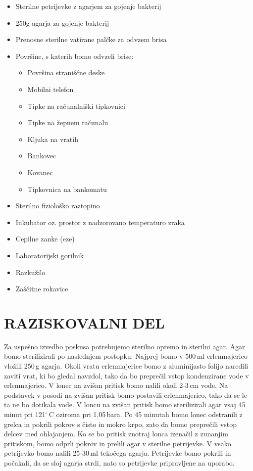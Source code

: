 \documentclass[12pt, a4paper]{report}
\begin{document}
\begin{itemize}
  \item Sterilne petrijevke z agarjem za gojenje bakterij
  \item 250g agarja za gojenje bakterij
  \item Prenosne sterilne vatirane palčke za odvzem brisa
  \item Površine, s katerih bomo odvzeli brise:
  \begin{itemize}
    \item Površina straniščne deske
    \item Mobilni telefon
    \item Tipke na računalniški tipkovnici
    \item Tipke na žepnem računalu
    \item Kljuka na vratih
    \item Bankovec
    \item Kovanec
    \item Tipkovnica na bankomatu
  \end{itemize}
  \item Sterilno fiziološko raztopino
  \item Inkubator oz. prostor z nadzorovano temperaturo zraka
  \item Cepilne zanke (eze)
  \item Laboratorijski gorilnik
  \item Razkužilo
  \item Zaščitne rokavice

\end{itemize}

\chapter{RAZISKOVALNI DEL}

Za uspešno izvedbo poskusa potrebujemo sterilno opremo in sterilni agar. Agar bomo sterilizirali po naslednjem postopku: Najprej bomo v 500\,ml erlenmajerico vložili 250\,g agarja. Okoli vratu erlenmajerice bomo z aluminijasto folijo naredili zaviti vrat, ki bo gledal navzdol, tako da bo preprečil vstop kondenzirane vode v erlenmajerico. V lonec na zvišan pritisk bomo nalili okoli 2-3\,cm vode. Na podstavek v posodi na zvišan pritisk bomo postavili erlenmajerico, tako da se le-ta ne bo dotikala vode. V loncu na zvišan pritisk bomo sterilizirali agar vsaj 45 minut pri 121$^\circ$\,C oziroma pri 1,05\,bara. Po 45 minutah bomo lonec odstranili z grelca in pokrili pokrov s čisto in mokro krpo, zato da bomo preprečili vstop delcev med ohlajanjem. Ko se bo pritisk znotraj lonca izenačil z zunanjim pritiskom, bomo odprli pokrov in prelili agar v sterilne petrijevke. V vsako petrijevko bomo nalili 25-30\,ml tekočega agarja. Petrijevke bomo pokrili in počakali, da se sloj agarja strdi, nato so petrijevke pripravljene na uporabo.
\end{document}
